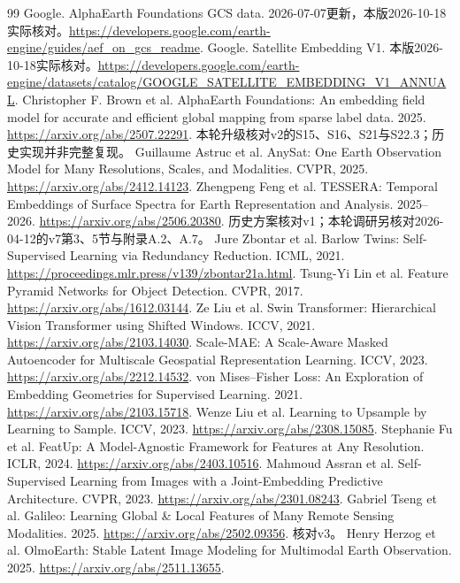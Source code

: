 \documentclass[UTF8,fontset=fandol,zihao=5,a4paper]{ctexart}
\newcommand{\reportpage}{\clearpage}
\begin{document}
\reportpage
{}
{}
\begin{thebibliography}{99}\small
{} Google. AlphaEarth Foundations GCS data. 2026-07-07更新，本版2026-10-18实际核对。\url{https://developers.google.com/earth-engine/guides/aef_on_gcs_readme}.
 Google. Satellite Embedding V1. 本版2026-10-18实际核对。\url{https://developers.google.com/earth-engine/datasets/catalog/GOOGLE_SATELLITE_EMBEDDING_V1_ANNUAL}.
 Christopher F. Brown et al. AlphaEarth Foundations: An embedding field model for accurate and efficient global mapping from sparse label data. 2025. \url{https://arxiv.org/abs/2507.22291}. 本轮升级核对v2的S15、S16、S21与S22.3；历史实现并非完整复现。
 Guillaume Astruc et al. AnySat: One Earth Observation Model for Many Resolutions, Scales, and Modalities. CVPR, 2025. \url{https://arxiv.org/abs/2412.14123}.
 Zhengpeng Feng et al. TESSERA: Temporal Embeddings of Surface Spectra for Earth Representation and Analysis. 2025--2026. \url{https://arxiv.org/abs/2506.20380}. 历史方案核对v1；本轮调研另核对2026-04-12的v7第3、5节与附录A.2、A.7。
 Jure Zbontar et al. Barlow Twins: Self-Supervised Learning via Redundancy Reduction. ICML, 2021. \url{https://proceedings.mlr.press/v139/zbontar21a.html}.
 Tsung-Yi Lin et al. Feature Pyramid Networks for Object Detection. CVPR, 2017. \url{https://arxiv.org/abs/1612.03144}.
 Ze Liu et al. Swin Transformer: Hierarchical Vision Transformer using Shifted Windows. ICCV, 2021. \url{https://arxiv.org/abs/2103.14030}.
 Scale-MAE: A Scale-Aware Masked Autoencoder for Multiscale Geospatial Representation Learning. ICCV, 2023. \url{https://arxiv.org/abs/2212.14532}.
 von Mises--Fisher Loss: An Exploration of Embedding Geometries for Supervised Learning. 2021. \url{https://arxiv.org/abs/2103.15718}.
 Wenze Liu et al. Learning to Upsample by Learning to Sample. ICCV, 2023. \url{https://arxiv.org/abs/2308.15085}.
 Stephanie Fu et al. FeatUp: A Model-Agnostic Framework for Features at Any Resolution. ICLR, 2024. \url{https://arxiv.org/abs/2403.10516}.
 Mahmoud Assran et al. Self-Supervised Learning from Images with a Joint-Embedding Predictive Architecture. CVPR, 2023. \url{https://arxiv.org/abs/2301.08243}.
 Gabriel Tseng et al. Galileo: Learning Global \& Local Features of Many Remote Sensing Modalities. 2025. \url{https://arxiv.org/abs/2502.09356}. 核对v3。
 Henry Herzog et al. OlmoEarth: Stable Latent Image Modeling for Multimodal Earth Observation. 2025. \url{https://arxiv.org/abs/2511.13655}.

\end{thebibliography}
\end{document}

